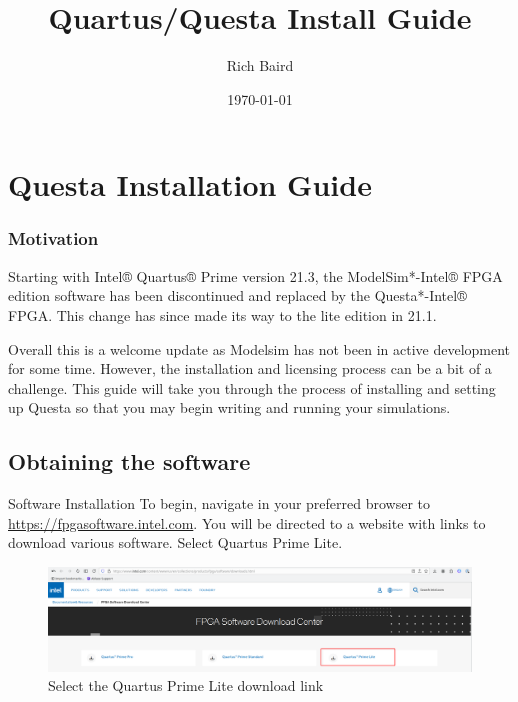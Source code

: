 \documentclass[fleqn]{beamer}
\title{Quartus/Questa Install Guide}
\author{Rich Baird}
\institute[University of Utah]{}
\date{\today}
\begin{document}
\begin{frame}
  \titlepage
\end{frame}

\section{Questa Installation Guide}
\begin{frame}
  \frametitle{Motivation}
    Starting with Intel® Quartus® Prime version 21.3, the ModelSim*-Intel® FPGA edition software has been discontinued and replaced by the Questa*-Intel® FPGA. This change has since made its way to the lite edition in 21.1. \par
    Overall this is a welcome update as Modelsim has not been in active development for some time. However, the installation and licensing process can be a bit of a challenge. This guide will take you through the process of installing and setting up Questa so that you may begin writing and running your simulations.
\end{frame}

\subsection{Obtaining the software}
\begin{frame}{Software Installation}
    To begin, navigate in your preferred browser to \url{https://fpgasoftware.intel.com}. You will be directed to a website with links to download various software. Select Quartus Prime Lite.
    
\begin{figure}
    \centering
    \includegraphics[width=1\linewidth]{setup_guide//figures/qprimelite_download.png}
    \caption{Select the Quartus Prime Lite download link}
    \label{fig:qprime_dl}
\end{figure}
\end{frame}
\end{document}
